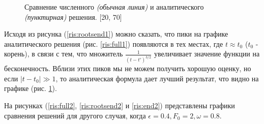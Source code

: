 \documentclass[%
bachelor,    %
natbib,      %
subf,        %
href,        %
colorlinks,  %
]{disser}
\begin{document}
\begin{figure}[h]
	\caption{Сравнение численного \textit{(обычная линия)} и аналитического \textit{(пунктирная)} решения. [20, 70]}
	\label{ris:end1}
\end{figure}

Исходя из рисунка (\ref{ris:rootsend1}) можно сказать, что пики на графике аналитического решения (рис. \ref{ris:full1}) появляются в тех местах, где $t\approx t_0$ ($t_0$ - корень), в связи с тем, что множитель $\frac{1}{(t-t')^{3/2}}$ увеличивает значение функции на бесконечность.
Вблизи этих пиков мы не можем получить хорошую оценку, но если $|t-t_0|\gg 1$,  то аналитическая формула дает лучший результат, что видно на графике (рис. \ref{ris:end1}).

На рисунках (\ref{ris:full2}, \ref{ris:rootsend2} и \ref{ris:end2}) представлены графики сравнения решений для другого случая, когда $\epsilon = 0.4, F_0 = 2, \omega = 0.8$.
\end{document}
